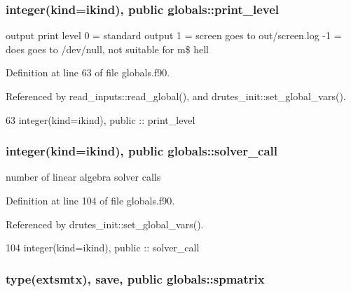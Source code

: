 \subsubsection[{print\+\_\+level}]{\setlength{\rightskip}{0pt plus 5cm}integer(kind=ikind), public globals\+::print\+\_\+level}\label{namespaceglobals_a982ca49c21157dbed9c9881aaa5ef08d}


output print level 0 = standard output 1 = screen goes to out/screen.\+log -\/1 = does goes to /dev/null, not suitable for m\$ hell 



Definition at line 63 of file globals.\+f90.



Referenced by read\+\_\+inputs\+::read\+\_\+global(), and drutes\+\_\+init\+::set\+\_\+global\+\_\+vars().


\begin{DoxyCode}
63   \textcolor{keywordtype}{integer(kind=ikind)}, \textcolor{keywordtype}{public} :: print_level
\end{DoxyCode}
\subsubsection[{solver\+\_\+call}]{\setlength{\rightskip}{0pt plus 5cm}integer(kind=ikind), public globals\+::solver\+\_\+call}\label{namespaceglobals_a0233facb5d9b029962dad5619fbafe49}


number of linear algebra solver calls 



Definition at line 104 of file globals.\+f90.



Referenced by drutes\+\_\+init\+::set\+\_\+global\+\_\+vars().


\begin{DoxyCode}
104   \textcolor{keywordtype}{integer(kind=ikind)}, \textcolor{keywordtype}{public} :: solver_call
\end{DoxyCode}
\subsubsection[{spmatrix}]{\setlength{\rightskip}{0pt plus 5cm}type({\bf extsmtx}), save, public globals\+::spmatrix}\label{namespaceglobals_a7185f37319968ff53d8ce3378dcea8e4}


